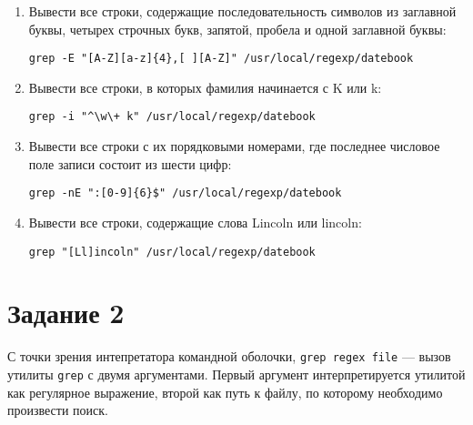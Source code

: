 \documentclass[listings]{labreport}
\begin{document}
\begin{enumerate}
\item Вывести все строки, содержащие последовательность символов из
  заглавной буквы, четырех строчных букв, запятой, пробела и одной заглавной буквы:
\begin{verbatim}
grep -E "[A-Z][a-z]{4},[ ][A-Z]" /usr/local/regexp/datebook
\end{verbatim}

\item Вывести все строки, в которых фамилия начинается с K или k:
\begin{verbatim}
grep -i "^\w\+ k" /usr/local/regexp/datebook
\end{verbatim}

\item Вывести все строки с их порядковыми номерами, где последнее числовое поле записи состоит из шести цифр:
\begin{verbatim}
grep -nE ":[0-9]{6}$" /usr/local/regexp/datebook
\end{verbatim}

\item Вывести все строки, содержащие слова Lincoln или lincoln:
\begin{verbatim}
grep "[Ll]incoln" /usr/local/regexp/datebook
\end{verbatim}
\end{enumerate}

\newpage
\section*{Задание 2}

С точки зрения интепретатора командной оболочки, \verb|grep regex file| —
вызов утилиты \verb|grep| с двумя аргументами.
Первый аргумент интерпретируется утилитой как регулярное выражение,
второй как путь к файлу, по которому необходимо произвести поиск.
\end{document}
